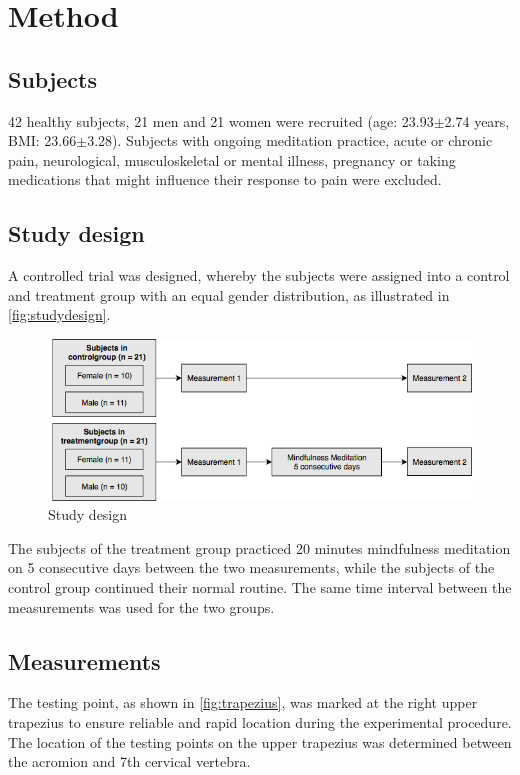 \section{Method}
\subsection{Subjects}
42 healthy subjects, 21 men and 21 women were recruited (age: 23.93$\pm$2.74 years, BMI: 23.66$\pm$3.28). Subjects with ongoing meditation practice, acute or chronic pain, neurological, musculoskeletal or mental illness, pregnancy or taking medications that might influence their response to pain were excluded.

\subsection{Study design}
A controlled trial was designed, whereby the subjects were assigned into a control and treatment group with an equal gender distribution, as illustrated in \autoref{fig:studydesign}.

\begin{figure}[H]
\centering
\includegraphics[width=1\columnwidth]{../figures/studydesign.png}
\caption{Study design}
\label{fig:studydesign}
\end{figure} 

\noindent 
The subjects of the treatment group practiced 20 minutes mindfulness meditation on 5 consecutive days between the two measurements, while the subjects of the control group continued their normal routine. The same time interval between the measurements was used for the two groups.

\subsection{Measurements}%
The testing point, as shown in \autoref{fig:trapezius}, was marked at the right upper trapezius to ensure reliable and rapid location during the experimental procedure. The location of the testing points on the upper trapezius was determined between the acromion and 7th cervical vertebra. 

